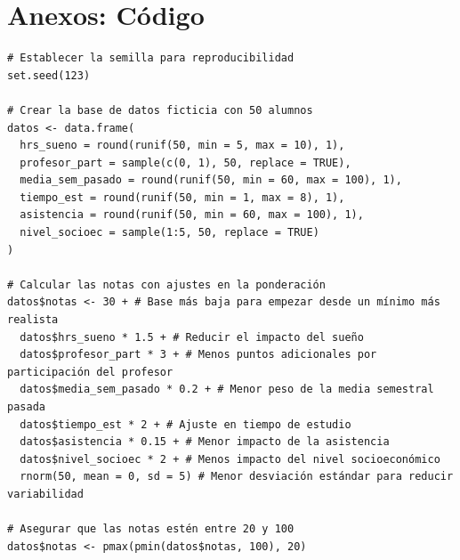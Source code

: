 \documentclass[letterpaper,11pt]{article}
\begin{document}
\section{Anexos: Código}
\begin{verbatim}
# Establecer la semilla para reproducibilidad
set.seed(123)

# Crear la base de datos ficticia con 50 alumnos
datos <- data.frame(
  hrs_sueno = round(runif(50, min = 5, max = 10), 1),
  profesor_part = sample(c(0, 1), 50, replace = TRUE),
  media_sem_pasado = round(runif(50, min = 60, max = 100), 1),
  tiempo_est = round(runif(50, min = 1, max = 8), 1),
  asistencia = round(runif(50, min = 60, max = 100), 1),
  nivel_socioec = sample(1:5, 50, replace = TRUE)
)

# Calcular las notas con ajustes en la ponderación
datos$notas <- 30 + # Base más baja para empezar desde un mínimo más realista
  datos$hrs_sueno * 1.5 + # Reducir el impacto del sueño
  datos$profesor_part * 3 + # Menos puntos adicionales por participación del profesor
  datos$media_sem_pasado * 0.2 + # Menor peso de la media semestral pasada
  datos$tiempo_est * 2 + # Ajuste en tiempo de estudio
  datos$asistencia * 0.15 + # Menor impacto de la asistencia
  datos$nivel_socioec * 2 + # Menos impacto del nivel socioeconómico
  rnorm(50, mean = 0, sd = 5) # Menor desviación estándar para reducir variabilidad

# Asegurar que las notas estén entre 20 y 100
datos$notas <- pmax(pmin(datos$notas, 100), 20)
\end{verbatim}
\end{document}
